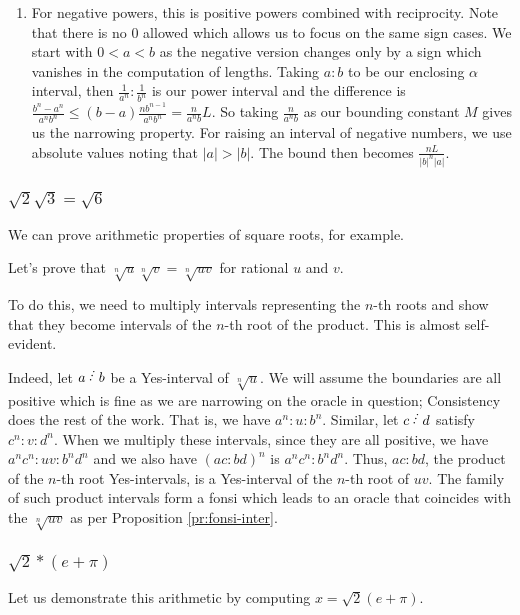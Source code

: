 \documentclass[12pt]{article}
\begin{document}
\begin{enumerate}
    \item For negative powers, this is positive powers combined with reciprocity. Note that there is no 0 allowed which allows us to focus on the same sign cases. We start with $0 < a < b$ as the negative version changes only by a sign which vanishes in the computation of lengths.  Taking $a:b$ to be our enclosing $\alpha$ interval, then $\frac{1}{a^n} : \frac{1}{b^n}$ is our power interval and the difference is $\frac{b^n-a^n}{a^n b^n} \leq (b-a) \frac{n b^{n-1}}{a^n b^n} = \frac{n}{a^n b} L$. So taking $\frac{n}{a^n b}$ as our bounding constant $M$ gives us the narrowing property.  For raising an interval of negative numbers, we use absolute values noting that  $|a|>|b|$. The bound then becomes $\frac{nL}{|b|^n |a|}$.
\end{enumerate}

\subsubsection{$\sqrt{2} \sqrt{3} = \sqrt{6}$}

We can prove arithmetic properties of square roots, for example. 

Let's prove that $\sqrt[n]{u} \sqrt[n]{v} = \sqrt[n]{uv}$  for rational $u$ and $v$.

To do this, we need to multiply intervals representing the $n$-th roots and show that they become intervals of the $n$-th root of the product. This is almost self-evident. 

Indeed, let $a\lte b$ be a Yes-interval of $\sqrt[n]{u}$. We will assume the boundaries are all positive which is fine as we are narrowing on the oracle in question; Consistency does the rest of the work. That is, we have $a^n:u:b^n$.  Similar, let $c \lte d$ satisfy $c^n : v : d^n$. When we multiply these intervals, since they are all positive, we have $a^n c^n : uv : b^n d^n$ and we also have $(ac:bd)^n$ is $a^n c^n : b^n d^n$. Thus, $ac:bd$, the product of the $n$-th root Yes-intervals, is a Yes-interval of the $n$-th root of $uv$. The family of such product intervals form a fonsi which leads to an oracle that coincides with the $\sqrt[n]{uv}$ as per Proposition \ref{pr:fonsi-inter}.

\subsubsection{$\sqrt{2}*(e + \pi)$}

Let us demonstrate this arithmetic by computing $x = \sqrt{2}(e + \pi)$. 
\end{document}
